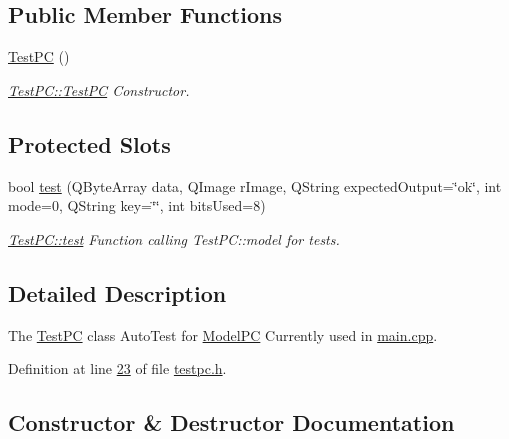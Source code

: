 \subsection*{Public Member Functions}
\begin{DoxyCompactItemize}
\item 
\mbox{\hyperlink{class_test_p_c_a65226eb54f1ff76639c9fb1e2013e430}{Test\+PC}} ()
\begin{DoxyCompactList}\small\item\em \mbox{\hyperlink{class_test_p_c_a65226eb54f1ff76639c9fb1e2013e430}{Test\+P\+C\+::\+Test\+PC}} Constructor. \end{DoxyCompactList}\end{DoxyCompactItemize}
\subsection*{Protected Slots}
\begin{DoxyCompactItemize}
\item 
bool \mbox{\hyperlink{class_test_p_c_a612a0409006417c6f03e1749bca0d45a}{test}} (Q\+Byte\+Array data, Q\+Image r\+Image, Q\+String expected\+Output=\char`\"{}ok\char`\"{}, int mode=0, Q\+String key=\char`\"{}\char`\"{}, int bits\+Used=8)
\begin{DoxyCompactList}\small\item\em \mbox{\hyperlink{class_test_p_c_a612a0409006417c6f03e1749bca0d45a}{Test\+P\+C\+::test}} Function calling Test\+P\+C\+::model for tests. \end{DoxyCompactList}\end{DoxyCompactItemize}


\subsection{Detailed Description}
The \mbox{\hyperlink{class_test_p_c}{Test\+PC}} class Auto\+Test for \mbox{\hyperlink{class_model_p_c}{Model\+PC}} Currently used in \mbox{\hyperlink{main_8cpp}{main.\+cpp}}. 

Definition at line \mbox{\hyperlink{testpc_8h_source_l00023}{23}} of file \mbox{\hyperlink{testpc_8h_source}{testpc.\+h}}.



\subsection{Constructor \& Destructor Documentation}
\mbox{\label{class_test_p_c_a65226eb54f1ff76639c9fb1e2013e430}} 
